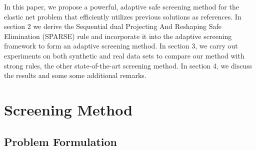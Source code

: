 In this paper, we propose a powerful, adaptive safe screening method for the elastic net problem that efficiently utilizes previous solutions as references. In section 2 we derive the Sequential dual Projecting And Reshaping Safe Elimination (SPARSE) rule and incorporate it into the adaptive screening framework to form an adaptive screening method. In section 3, we carry out experiments on both synthetic and real data sets to compare our method with strong rules, the other state-of-the-art screening method. In section 4, we discuss the results and some some additional remarks.

\section{Screening Method}
\subsection{Problem Formulation}
\label{sec:formulation}

